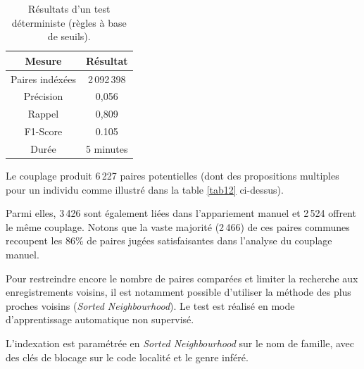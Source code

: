\documentclass[a4paper,12pt,twoside]{book}
\begin{document}
	            \begin{table}[htbp]
    	            \centering
                    \renewcommand\cellalign{cl}
    			        \begin{tabular}{|c|c|}
    			        \hline
			            Mesure & Résultat\\\hline
			            Paires indéxées & 2\,092\,398\\\hline
			            Précision & 0,056\\\hline
			            Rappel & 0,809\\\hline
			            F1-Score & 0.105\\\hline
			            Durée & 5 minutes\\\hline
                    \end{tabular}
                \caption{Résultats d'un test déterministe (règles à base de seuils).}\label{tab13}
			    \end{table}   
                \vspace{-0.8em}
                
                Le couplage produit 6\,227 paires potentielles (dont des propositions multiples pour un individu comme illustré dans la table \ref{tab12} ci-dessus).
                
	            Parmi elles, 3\,426 sont également liées dans l'appariement manuel et 2\,524 offrent le même couplage. Notons que la vaste majorité (2\,466) de ces paires communes recoupent les 86\% de paires jugées satisfaisantes dans l'analyse du couplage manuel.
	            \newline
	            
	            Pour restreindre encore le nombre de paires comparées et limiter la recherche aux enregistrements voisins, il est notamment possible d'utiliser la méthode des plus proches voisins (\textit{Sorted Neighbourhood}).
	            Le test est réalisé en mode d'apprentissage automatique non supervisé.
	            
	            L'indexation est paramétrée en \textit{Sorted Neighbourhood} sur le nom de famille, avec des clés de blocage sur le code localité et le genre inféré.
	            
\end{document}
